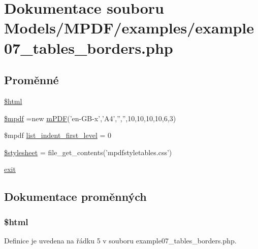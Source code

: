 \hypertarget{example07__tables__borders_8php}{\section{Dokumentace souboru Models/\-M\-P\-D\-F/examples/example07\-\_\-tables\-\_\-borders.php}
\label{example07__tables__borders_8php}
}
\subsection*{Proměnné}
\begin{DoxyCompactItemize}
\item 
\hyperlink{example07__tables__borders_8php_a6f96e7fc92441776c9d1cd3386663b40}{\$html}
\item 
\hyperlink{example07__tables__borders_8php_ad028f81910d6cbab9b184d2214b3a8f8}{\$mpdf} =new \hyperlink{classm_p_d_f}{m\-P\-D\-F}('en-\/G\-B-\/x','A4','','',10,10,10,10,6,3)
\item 
\$mpdf \hyperlink{example07__tables__borders_8php_a8780612514d14375709d0685d189579e}{list\-\_\-indent\-\_\-first\-\_\-level} = 0
\item 
\hyperlink{example07__tables__borders_8php_a19e5cf73e817c55a49205e6ec78c88a8}{\$stylesheet} = file\-\_\-get\-\_\-contents('mpdfstyletables.\-css')
\item 
\hyperlink{example07__tables__borders_8php_a6733eb5f605d09eaede9845835d71c4e}{exit}
\end{DoxyCompactItemize}


\subsection{Dokumentace proměnných}
\hypertarget{example07__tables__borders_8php_a6f96e7fc92441776c9d1cd3386663b40}{
\subsubsection[{\$html}]{\setlength{\rightskip}{0pt plus 5cm}\$html}}\label{example07__tables__borders_8php_a6f96e7fc92441776c9d1cd3386663b40}


Definice je uvedena na řádku 5 v souboru example07\-\_\-tables\-\_\-borders.\-php.

